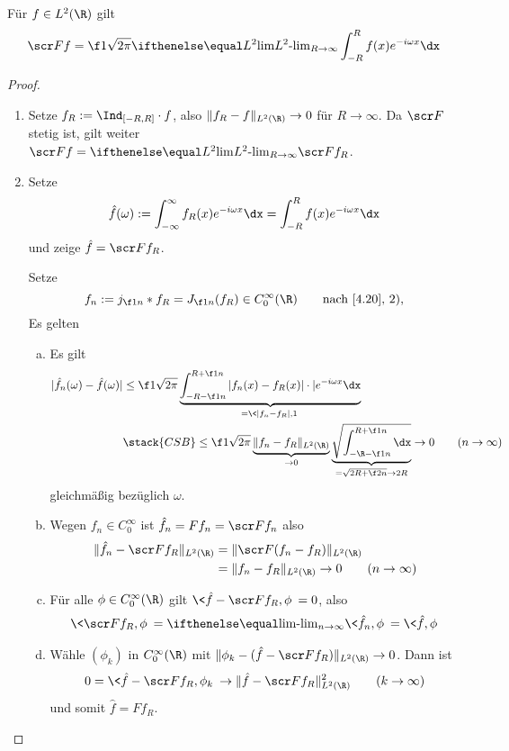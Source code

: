 \begin{st} \label{4.23}
	Für $f \in L^2(\R)$ gilt
	\[
		\scr F f = \f 1{\sqrt{2\pi}} \lim[L^2]_{R\to\infty} \int_{-R}^R f(x)e^{-i\omega x} \dx
	\]
	\begin{proof}
		\begin{enumerate}[1)]
			\item
				Setze $f_R := \Ind_{[-R,R]} \cdot f$, also $\|f_R - f\|_{L^2(\R)} \to 0$ für $R \to \infty$.
				Da $\scr F$ stetig ist, gilt weiter $\scr F f = \lim[L^2]_{R\to\infty} \scr F f_R$.
			\item
				Setze 
				\[
					\hat f(\omega)  := \int_{-\infty}^\infty f_R(x) e^{-i\omega x} \dx
					= \int_{-R}^R f(x) e^{-i\omega x} \dx
				\]
				und zeige $\hat f = \scr F f_R$.
							
				Setze 
				\[
					f_n := j_{\f 1n} \ast f_R 
					= J_{\f 1n} (f_R) \in C_0^\infty(\R) \qquad \text{nach \ref{4.20}, 2)},
				\]
				Es gelten
				\begin{enumerate}[a)]
					\item
						Es gilt
						\begin{align*}
							|\hat f_n(\omega) - \hat f(\omega)|
							& \le \f 1{\sqrt{2\pi}} \underbrace{\int_{-R-\f 1n}^{R+\f 1n} |f_n(x) - f_R(x)|\cdot |e^{-i\omega x} \dx}_{= \<|f_n-f_R|,1\>} \\
							&\stack{CSB}\le \f 1{\sqrt{2\pi}} \underbrace{\|f_n - f_R\|_{L^2(\R)}}_{\to 0} \underbrace{\sqrt{\int_{-\R-\f 1n}^{R+\f 1n} \dx}}_{= \sqrt{2R + \f 2n} \to 2R}
							\to 0 \qquad (n\to \infty)
						\end{align*}
						gleichmäßig bezüglich $\omega$.
					\item
						Wegen $f_n \in C_0^\infty$ ist $\hat f_n = F f_n = \scr F f_n$ also
						\begin{align*}
							\|\hat f_n - \scr F f_R\|_{L^2(\R)}
							&= \|\scr F(f_n -f_R)\|_{L^2(\R)} \\
							&= \|f_n - f_R\|_{L^2(\R)}
							\to 0 \qquad (n\to \infty)
						\end{align*}
					\item
						Für alle $\phi \in C_0^\infty(\R)$ gilt $\<\hat f - \scr F f_R, \phi\> = 0$, also
						\begin{align*}
							\< \scr F f_R, \phi\> = \lim_{n\to\infty} \<\hat f_n, \phi\>
							= \<\hat f, \phi\>
						\end{align*}
					\item
						Wähle $(\phi_k)$ in $C_0^\infty(\R)$ mit $\|\phi_k - (\hat f - \scr F f_R)\|_{L^2(\R)} \to 0$.
						Dann ist
						\[
							0 = \<\hat f - \scr F f_R, \phi_k\> \to \|\hat f - \scr F f_R\|_{L^2(\R)}^2 \qquad (k\to \infty)
						\]
						und somit $\hat f = F f_R$.
				\end{enumerate}
		\end{enumerate}

	\end{proof}
\end{st}

